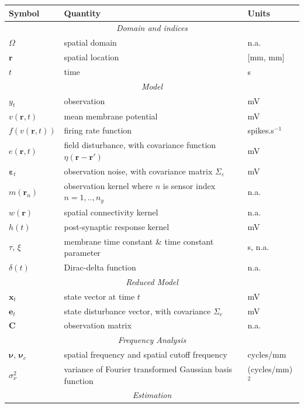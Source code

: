 \documentclass[review,authoryear,3p]{elsarticle}
\begin{document}
\begin{table}[!t]
\begin{tabular}{|l|l|l|}
	\hline
	\textbf{Symbol} & \textbf{Quantity} & \textbf{Units}\\
	\hline
	\multicolumn{3}{|c|}{\emph{Domain and indices}}\\
	\hline
	$\Omega$ & spatial domain & n.a.\\
	$\mathbf{r}$ & spatial location & [mm, mm]\\
	$t$ & time & s\\
	\hline
	\multicolumn{3}{|c|}{\emph{Model}}\\
	\hline
    $y_t$ & observation & mV\\
    $v(\mathbf{r},t)$ & mean membrane potential & mV \\
	$f(v\left(\mathbf{r},t\right))$ & firing rate function & spikes.s$^{-1}$\\
	$e(\mathbf{r},t)$ & field disturbance, with covariance function $\eta(\mathbf r-\mathbf r')$ & mV\\
	$\boldsymbol\varepsilon_t$ & observation noise, with covariance matrix $\Sigma_\varepsilon$ & mV\\
	$m(\mathbf{r}_n)$ & observation kernel where $n$ is sensor index $n=1,..,n_y$ & n.a. \\
	$w(\mathbf{r})$ & spatial connectivity kernel & n.a.\\
	$h(t)$ & post-synaptic response kernel & mV\\
	$\tau$, $\xi$ & membrane time constant \& time constant parameter & s, n.a.\\
	$\delta(t)$ & Dirac-delta function & n.a.\\
	\hline
	\multicolumn{3}{|c|}{\emph{Reduced Model}} \\
	\hline
   	$\mathbf{x}_t$ & state vector at time $t$ & mV\\
   	$\mathbf{e}_t$ & state disturbance vector, with covariance $\Sigma_e$ & mV\\
   	$\mathbf{C}$ & observation matrix & n.a. \\
	\hline
	\multicolumn{3}{|c|}{\emph{Frequency Analysis}} \\
	\hline
	$\boldsymbol{\nu}$, $\boldsymbol{\nu}_c$ & spatial frequency and spatial cutoff frequency & cycles/mm \\
	$\sigma_{\nu}^2$ & variance of Fourier transformed Gaussian basis function & (cycles/mm)$^2$\\
	\hline
	\multicolumn{3}{|c|}{\emph{Estimation}} \\

\end{tabular}
\end{table}
\end{document}
